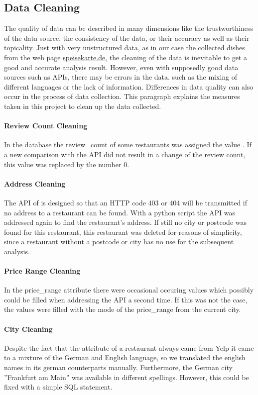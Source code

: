 \subsection{Data Cleaning}
\label{subsec:cleaning}
The quality of data can be described in many dimensions like \eg{} the trustworthiness of the data source, the consistency of the data,
or their accuracy as well as their topicality.
Just with very unstructured data, as in our case the collected dishes from the web page \url{speisekarte.de}, the cleaning of the data is
inevitable to get a good and accurate analysis result.
However, even with supposedly good data sources such as \acp{API}, there may be errors in the data.
such as \eg{} the mixing of different languages or the lack of information.
Differences in data quality can also occur in the process of data collection.
\newline
This paragraph explains the measures taken in this project to clean up the data collected.
\paragraph{Review Count Cleaning}
In the \pg{} database the review\_count of some restaurants was assigned the value .
If a new comparison with the \ylp{} \ac{API} did not result in a change of the review count,
this  value was replaced by the number 0.
\paragraph{Address Cleaning}
The \ac{API} of \ylp{} is designed so that an HTTP code 403 or 404 will be transmitted if no address to a restaurant
can be found.
With a python script the \ylp{} \ac{API} was addressed again to find the restaurant's address.
If still no city or postcode was found for this restaurant, this restaurant was deleted for reasons of simplicity,
since a restaurant without a postcode or city has no use for the subsequent analysis.
\paragraph{Price Range Cleaning}
In the price\_range attribute there were occasional occuring  values which possibly could be filled when addressing the \ylp{} \ac{API} a second time.
If this was not the case, the  values were filled with the mode of the price\_range from the current city.
\paragraph{City Cleaning}
Despite the fact that the  attribute of a restaurant always came from Yelp it came to a mixture of the German and English language,
so we translated the english names in its german counterparts manually.
Furthermore, the German city ''Frankfurt am Main'' was available in different spellings.
However, this could be fixed with a simple \ac{SQL} statement.
